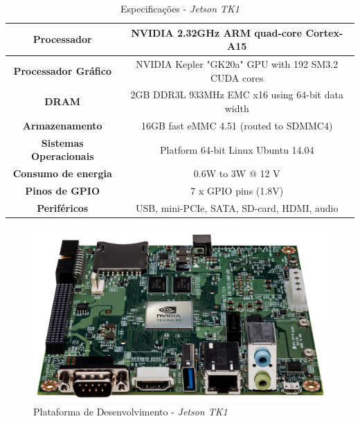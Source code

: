 \begin{table}[]
\centering
\caption{Especificações - \textit{Jetson TK1}}
\label{jetson_tk1_tab}
\begin{tabular}{|c|c|}
\hline
\textbf{Processador}           & NVIDIA 2.32GHz ARM quad-core Cortex-A15              \\	\hline
\textbf{Processador Gráfico}   & NVIDIA Kepler "GK20a" GPU  with 192 SM3.2 CUDA cores \\	\hline
\textbf{DRAM}                  & 2GB DDR3L 933MHz EMC x16 using 64-bit data width     \\	\hline
\textbf{Armazenamento}         & 16GB fast eMMC 4.51 (routed to SDMMC4)               \\	\hline
\textbf{Sistemas Operacionais} & Platform 64-bit Linux Ubuntu 14.04                   \\	\hline
\textbf{Consumo de energia}    & 0.6W to 3W @ 12 V                                    \\	\hline
\textbf{Pinos de GPIO}         & 7 x GPIO pins (1.8V)                                 \\	\hline
\textbf{Periféricos}           & USB, mini-PCIe, SATA, SD-card, HDMI, audio           \\	\hline
\end{tabular}
\end{table}

\begin{figure}[H]
	\centering
	\includegraphics[scale=0.10]{./Resources/jetson_tk1.jpg}
	\caption{Plataforma de Desenvolvimento - \textit{Jetson TK1}}
	\label{jetson_tk1}
\end{figure}


